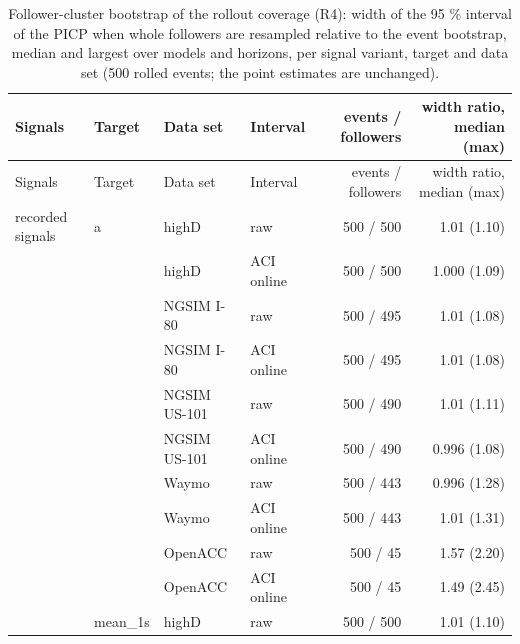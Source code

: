 \begingroup
\small
\begin{longtable}{llllrr}
\caption{Follower-cluster bootstrap of the rollout coverage (R4): width of the 95 \% interval of the PICP when whole followers are resampled relative to the event bootstrap, median and largest over models and horizons, per signal variant, target and data set (500 rolled events; the point estimates are unchanged).}\label{tab:t4-follower-clusters} \\
\toprule
Signals & Target & Data set & Interval & events / followers & width ratio, median (max) \\
\midrule
\endfirsthead
\toprule
Signals & Target & Data set & Interval & events / followers & width ratio, median (max) \\
\midrule
\endhead
\bottomrule
\endlastfoot
recorded signals & a & highD & raw & 500 / 500 & 1.01 (1.10) \\
 &  & highD & ACI online & 500 / 500 & 1.000 (1.09) \\
 &  & NGSIM I-80 & raw & 500 / 495 & 1.01 (1.08) \\
 &  & NGSIM I-80 & ACI online & 500 / 495 & 1.01 (1.08) \\
 &  & NGSIM US-101 & raw & 500 / 490 & 1.01 (1.11) \\
 &  & NGSIM US-101 & ACI online & 500 / 490 & 0.996 (1.08) \\
 &  & Waymo & raw & 500 / 443 & 0.996 (1.28) \\
 &  & Waymo & ACI online & 500 / 443 & 1.01 (1.31) \\
 &  & OpenACC & raw & 500 / 45 & 1.57 (2.20) \\
 &  & OpenACC & ACI online & 500 / 45 & 1.49 (2.45) \\
\midrule
 & mean\_1s & highD & raw & 500 / 500 & 1.01 (1.10) \\

\end{longtable}
